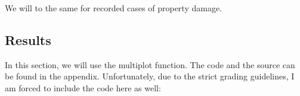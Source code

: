 \documentclass[]{article}
\newenvironment{Shaded}{\begin{snugshade}}{\end{snugshade}}
\newcommand{\KeywordTok}[1]{\textcolor[rgb]{0.13,0.29,0.53}{\textbf{{#1}}}}
\newcommand{\DataTypeTok}[1]{\textcolor[rgb]{0.13,0.29,0.53}{{#1}}}
\newcommand{\DecValTok}[1]{\textcolor[rgb]{0.00,0.00,0.81}{{#1}}}
\newcommand{\StringTok}[1]{\textcolor[rgb]{0.31,0.60,0.02}{{#1}}}
\newcommand{\NormalTok}[1]{{#1}}
\begin{document}
We will to the same for recorded cases of property damage.

\begin{Shaded}
\end{Shaded}

\subsection{Results}\label{results}

In this section, we will use the multiplot function. The code and the
source can be found in the appendix. Unfortunately, due to the strict
grading guidelines, I am forced to include the code here as well:
\end{document}
